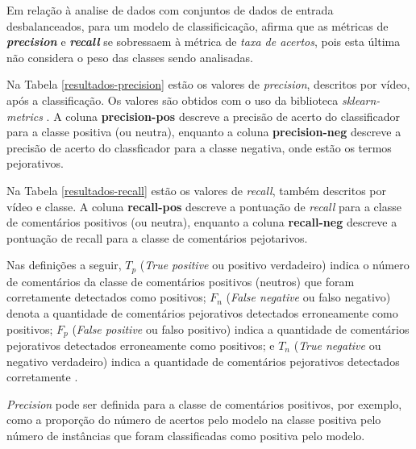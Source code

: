 Em relação à analise de dados com conjuntos de dados de entrada desbalanceados, para um modelo de classificicação, \cite{tan2009DataMining} afirma que as métricas de \textbf{\textit{precision}} e \textbf{\textit{recall}} se sobressaem à métrica de \textit{taxa de acertos}, pois esta última não considera o peso das classes sendo analisadas.

Na Tabela \ref{resultados-precision} estão os valores de \textit{precision}, descritos por vídeo, após a classificação. Os valores são obtidos com o uso da biblioteca \textit{sklearn-metrics} \cite{scikit-learn}. A coluna \textbf{precision-pos} descreve a precisão de acerto do classificador para a classe positiva (ou neutra), enquanto a coluna \textbf{precision-neg} descreve a precisão de acerto do classficador para a classe negativa, onde estão os termos pejorativos.

Na Tabela \ref{resultados-recall} estão os valores de \textit{recall}, também descritos por vídeo e classe. A coluna \textbf{recall-pos} descreve a pontuação de \textit{recall} para a classe de comentários positivos (ou neutra), enquanto a coluna \textbf{recall-neg} descreve a pontuação de recall para a classe de comentários pejotarivos.





Nas definições a seguir, $T_p$ (\textit{True positive} ou positivo verdadeiro) indica o número de comentários da classe de comentários positivos (neutros) que foram corretamente detectados como positivos; $F_n$ (\textit{False negative} ou falso negativo) denota a quantidade de comentários pejorativos detectados erroneamente como positivos; $F_p$ (\textit{False positive} ou falso positivo) indica a quantidade de comentários pejorativos detectados erroneamente como positivos; e $T_n$ (\textit{True negative} ou negativo verdadeiro) indica a quantidade de comentários pejorativos detectados corretamente \cite{tan2009DataMining}.

\textit{Precision} pode ser definida para a classe de comentários positivos, por exemplo, como a proporção do número de acertos pelo modelo na classe positiva pelo número de instâncias que foram classificadas como positiva pelo modelo. 

